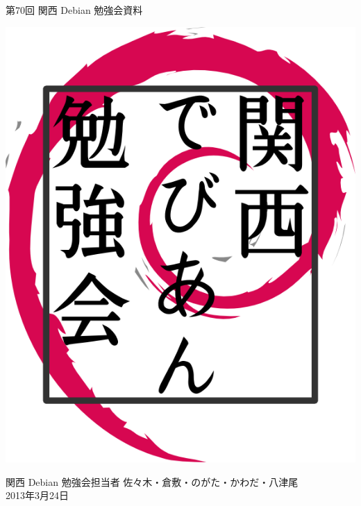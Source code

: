 \documentclass[mingoth,a4paper]{jsarticle}
\newcommand{\debmtgyear}{2013}
\newcommand{\debmtgdate}{24}
\newcommand{\debmtgmonth}{3}
\newcommand{\debmtgnumber}{70}
\begin{document}
\begin{titlepage}


 第\debmtgnumber{}回 関西 Debian 勉強会資料

\vspace{2cm}

\begin{center}
\includegraphics{image200802/kansaidebianlogo.png}
\end{center}

\begin{flushright}
\hfill{}関西 Debian 勉強会担当者 佐々木・倉敷・のがた・かわだ・八津尾 \\
\hfill{}\debmtgyear{}年\debmtgmonth{}月\debmtgdate{}日
\end{flushright}

\thispagestyle{empty}
\end{titlepage}


\vspace{1em}
\end{document}

